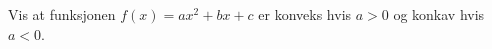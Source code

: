 





\opgt

Vis at funksjonen $ {f(x)=a x^2+b x + c}  $ er konveks hvis $ {a>0} $ og konkav hvis $ {a<0} $.
